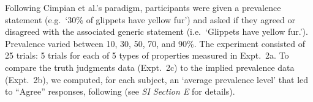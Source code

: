 \documentclass{pnastwo}
\begin{document}
\begin{article}
\begin{materials}
Following Cimpian et al.'s paradigm, participants were given a prevalence statement (e.g.~`30\% of glippets have yellow fur') and asked if they agreed or disagreed with the associated generic statement (i.e.~`Glippets have yellow fur.').
Prevalence varied between 10, 30, 50, 70, and 90\%.
The experiment consisted of 25 trials: 5 trials for each of 5 types of properties measured in Expt.~2a. %
To compare the truth judgments data (Expt.~2c) to the implied prevalence data (Expt.~2b), we computed, for each subject, an `average prevalence level' that led to ``Agree'' responses, following \cite{Cimpian2010} (see {\it SI Section E} for details).

\end{materials}
\end{article}
\end{document}

